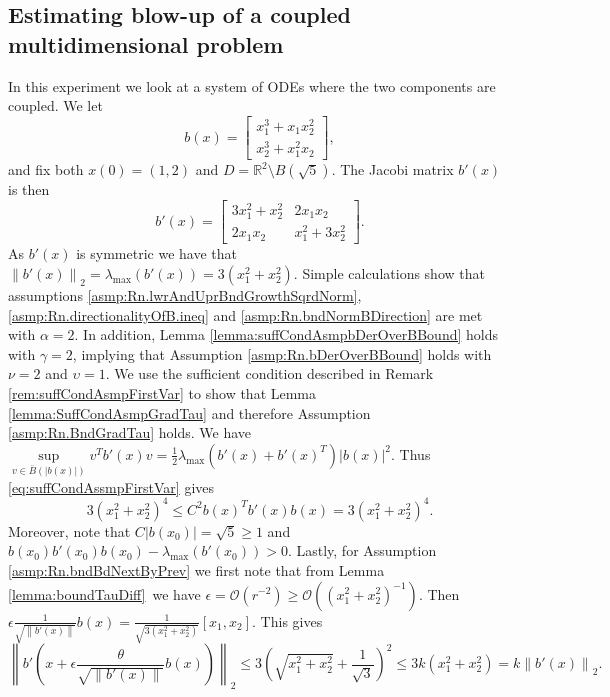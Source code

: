 \documentclass[a4paper, oneside, reqno]{amsart}
\newcommand{\abs}[1]{\left\lvert#1\right\rvert}
\newcommand{\norm}[1]{\left\|#1\right\|}
\newcommand{\R}{\mathbb{R}}
\theoremstyle{remark}
\begin{document}
\subsection{Estimating blow-up of a coupled multidimensional problem}
\label{sec:numExp_CoupledProblem}
In this experiment we look at a system of ODEs where the two components are coupled. We let 
\[b(x) = \begin{bmatrix}
        x_1^3 + x_1x_2^2 \\
        x_2^3 + x_1^2x_2
         \end{bmatrix},\]
and fix both \(x(0) = (1, 2)\) and \(D = \R^2\setminus B(\sqrt{5})\). The Jacobi matrix \(b'(x)\) is then
\[b'(x) = \begin{bmatrix}
        3x_1^2 + x_2^2 & 2x_1x_2 \\
        2x_1x_2 & x_1^2 + 3x_2^2
         \end{bmatrix}.\]
As \(b'(x)\) is symmetric we have that \(\norm{b'(x)}_2 = \lambda_{\max}(b'(x)) = 3(x_1^2+x_2^2)\). Simple calculations show that assumptions \ref{asmp:Rn.lwrAndUprBndGrowthSqrdNorm}, \ref{asmp:Rn.directionalityOfB.ineq} and \ref{asmp:Rn.bndNormBDirection} are met with \(\alpha = 2\). In addition, Lemma \ref{lemma:suffCondAsmpbDerOverBBound} holds with \(\gamma=2\), implying that Assumption \ref{asmp:Rn.bDerOverBBound} holds with \(\nu=2\) and \(\upsilon=1\). We use the sufficient condition described in Remark \ref{rem:suffCondAsmpFirstVar} to show that Lemma \ref{lemma:SuffCondAsmpGradTau} and therefore Assumption \ref{asmp:Rn.BndGradTau} holds. We have \(\underset{v\in \bar B\left(\abs{b(x)}\right)}{\sup} v^Tb'(x)v = \frac{1}{2}\lambda_{\max}\left(b'(x)+b'(x)^T\right)\abs{b(x)}^2\). Thus \eqref{eq:suffCondAssmpFirstVar} gives
\[3(x_1^2+x_2^2)^4 \leq C^2b(x)^Tb'(x)b(x) = 3(x_1^2+x_2^2)^4.\] Moreover, note that \(C\abs{b(x_0)} = \sqrt{5}\geq1\) and \(b(x_0)b'(x_0)b(x_0)-\lambda_{\max}(b'(x_0)) > 0\). Lastly, for Assumption \ref{asmp:Rn.bndBdNextByPrev} we first note that from Lemma \ref{lemma:boundTauDiff}\ we have \(\epsilon =\mathcal{O}(r^{-2}) \geq \mathcal{O}((x_1^2 + x_2^2)^{-1})\). Then \(\epsilon\frac{1}{\sqrt{\norm{b'(x)}}}b(x) = \frac{1}{\sqrt{3(x_1^2 + x_2^2)}}[x_1, x_2]\). 
This gives
\[\norm{b'\left(x +\epsilon\frac{\theta}{\sqrt{\norm{b'(x)}}}b(x) \right)}_2 \leq 3\left(\sqrt{x_1^2 + x_2^2}+\frac{1}{\sqrt{3}}\right)^2 \leq 3k(x_1^2 + x_2^2) = k\norm{b'(x)}_2.\]
\end{document}
